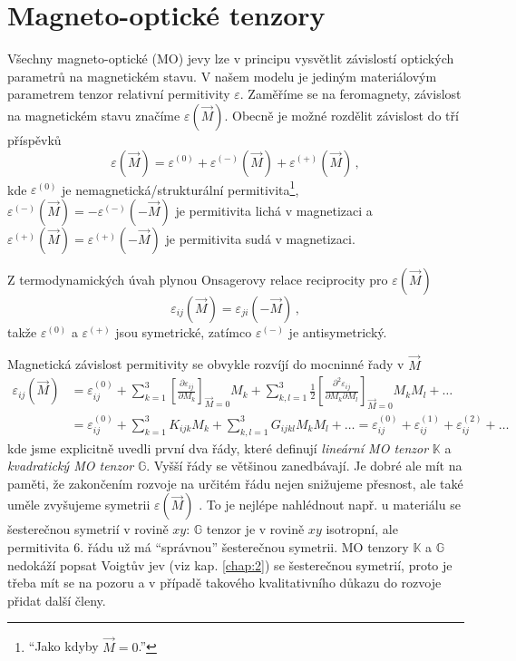 \section{Magneto-optické tenzory}
\label{chap:magnetoopticke-tenzory}

Všechny magneto-optické (MO) jevy lze v principu vysvětlit závislostí optických parametrů na magnetickém stavu\cite{silberQuadraticMagnetoopticKerr2019a}.
V našem modelu je jediným materiálovým parametrem tenzor relativní permitivity $\varepsilon$.
Zaměříme se na feromagnety, závislost na magnetickém stavu značíme $\varepsilon(\vec{M})$.
Obecně je možné rozdělit závislost do tří příspěvků
\begin{equation}
    \varepsilon(\vec{M})=\varepsilon^{(0)} + \varepsilon^{(-)}(\vec{M}) + \varepsilon^{(+)}(\vec{M}) \,,
\end{equation}
kde $\varepsilon^{(0)}$ je nemagnetická/strukturální permitivita\footnote{``Jako kdyby $\vec{M}=0$.''},
$\varepsilon^{(-)}(\vec{M})=-\varepsilon^{(-)}(-\vec{M})$ je permitivita lichá v magnetizaci
a $\varepsilon^{(+)}(\vec{M})=\varepsilon^{(+)}(-\vec{M})$ je permitivita sudá v magnetizaci.

Z termodynamických úvah plynou Onsagerovy relace reciprocity\cite{onsagerReciprocalRelationsIrreversible1931a,onsagerReciprocalRelationsIrreversible1931} pro $\varepsilon(\vec{M})$
\begin{equation}
    \varepsilon_{ij}(\vec{M})=\varepsilon_{ji}(-\vec{M}) \,,
\end{equation}
takže $\varepsilon^{(0)}$ a $\varepsilon^{(+)}$ jsou symetrické, zatímco $\varepsilon^{(-)}$ je antisymetrický.

Magnetická závislost permitivity se obvykle rozvíjí do mocninné řady v $\vec{M}$ \cite{visnovskyOpticsMagneticMultilayers2018}
\begin{align} 
\label{eqn:MO-tenzory}
    \varepsilon_{ij}(\vec{M})&=\varepsilon^{(0)}_{ij}
        + \sum_{k=1}^{3}\left[ \frac{\partial \varepsilon_{ij}}{\partial M_k}\right]_{\vec{M}=0} M_k 
        + \sum_{k,l=1}^{3} \frac{1}{2}\left[ \frac{\partial^2 \varepsilon_{ij}}{\partial M_k \partial M_l}\right]_{\vec{M}=0} M_k M_l + \dots 
    \\ &=\varepsilon^{(0)}_{ij} 
        + \sum_{k=1}^{3}K_{ijk} M_k 
        + \sum_{k,l=1}^{3} G_{ijkl} M_k M_l + \dots
        =\varepsilon^{(0)}_{ij} +\varepsilon^{(1)}_{ij} +\varepsilon^{(2)}_{ij} + \dots
\end{align}
kde jsme explicitně uvedli první dva řády, které definují \emph{lineární MO tenzor} $\mathbb{K}$ a \emph{kvadratický MO tenzor} $\mathbb{G}$.
Vyšší řády se většinou zanedbávají.
Je dobré ale mít na paměti, že zakončením rozvoje na určitém řádu nejen snižujeme přesnost, ale také uměle zvyšujeme symetrii $\varepsilon(\vec{M})$ \cite{silberQuadraticMagnetoopticKerr2019a}.
To je nejlépe nahlédnout např. u materiálu se šesterečnou symetrií v rovině $xy$: $\mathbb{G}$ tenzor je v rovině $xy$ isotropní, ale permitivita 6. řádu už má ``správnou'' šesterečnou symetrii.
MO tenzory $\mathbb{K}$ a $\mathbb{G}$ nedokáží popsat Voigtův jev (viz kap. \ref{chap:2}) se šesterečnou symetrií, proto je třeba mít se na pozoru a v případě takového kvalitativního důkazu do rozvoje přidat další členy.

